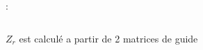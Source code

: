 \documentclass[12pt,xcolor=x11names,compress, notes=show]{beamer}%
\begin{document}
\begin{frame}{\insertsectionhead : \insertsubsectionhead }
\begin{columns}[T]
		\vspace{2cm}
$Z_r$ est calculé a partir de 2 matrices de guide

\end{columns}

\end{frame}




%
\end{document}
